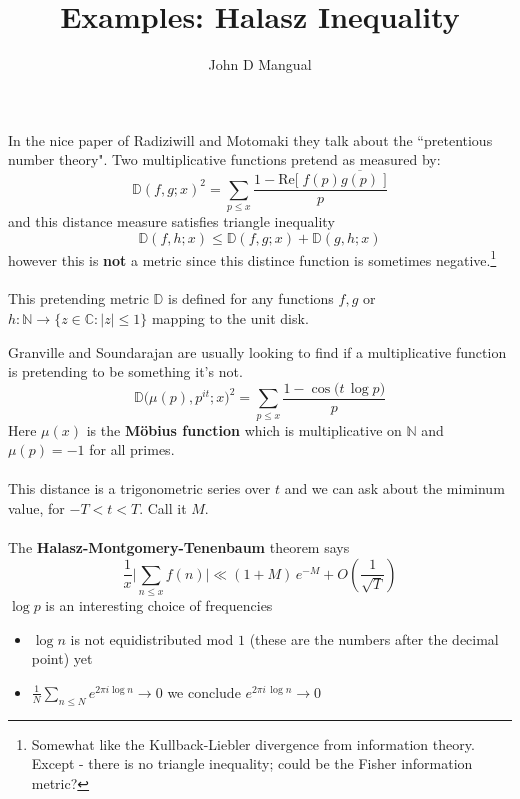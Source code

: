 \documentclass[12pt]{article}
\title{\textbf{ Examples: Halasz Inequality}}
\author{John D Mangual}
\date{}
\begin{document}
\selectfont \fontsize{25}{30}\selectfont

\maketitle

\noindent In the nice paper of Radiziwill and Motomaki they talk about the ``pretentious number theory".  Two {\color{blue}multiplicative} functions pretend as measured by:
$$ \mathbb{D}(f,g; x)^2 = \sum_{p \leq x} \frac{1 - \mathrm{Re}\big[\;f(p)\overline{g(p)}\;\big]}{p} $$
and this distance measure satisfies triangle inequality
$$ \mathbb{D}(f,h; x) \leq
\mathbb{D}(f,g; x) +\mathbb{D}(g,h; x) $$
however this is \textbf{not} a metric since this distince function is sometimes negative.\footnote{Somewhat like the Kullback-Liebler divergence from information theory.  Except - there is no triangle inequality; could be the Fisher information metric?} \\ \\
This pretending metric $\mathbb{D}$ is defined for any functions $f,g$ or $h: \mathbb{N} \to \{ z \in \mathbb{C}: |z| \leq 1 \}$ mapping to the unit disk.

\newpage

\noindent Granville and Soundarajan are usually looking to find if a multiplicative function is pretending to be something it's not. 
$$ \mathbb{D}\Big( \mu(p) , p^{it} ; x\Big)^2
= \sum_{p \leq x} \frac{1 -  \cos \big(t\, \log p\big) }{p}$$
Here $\mu(x)$ is the \textbf{M\"{o}bius function} which is multiplicative on $\mathbb{N}$ and $\mu(p) = -1$ for all primes. \\ \\
This distance is a {\color{red!50!white} trigonometric series} over $t$ and we can ask about the miminum value, for $-T < t < T$. Call it $M$.\\ \\
The \textbf{Halasz-Montgomery-Tenenbaum} theorem says
$$ \frac{1}{x} \Big| \sum_{n \leq x} f(n)\Big|
\ll (1+M) \, e^{-M} + O\left( \frac{1}{\sqrt{T}}\right) $$
$\log p$ is an interesting choice of frequencies 
\begin{itemize}
\item $\log n$ is not equidistributed mod $1$ (these are the numbers after the decimal point)  yet
\item $\displaystyle \frac{1}{N} \sum_{n \leq N} e^{2\pi i \log n} \to 0 $ we conclude $e^{2\pi i \, \log n} \to 0 $
\end{itemize}
\end{document}

